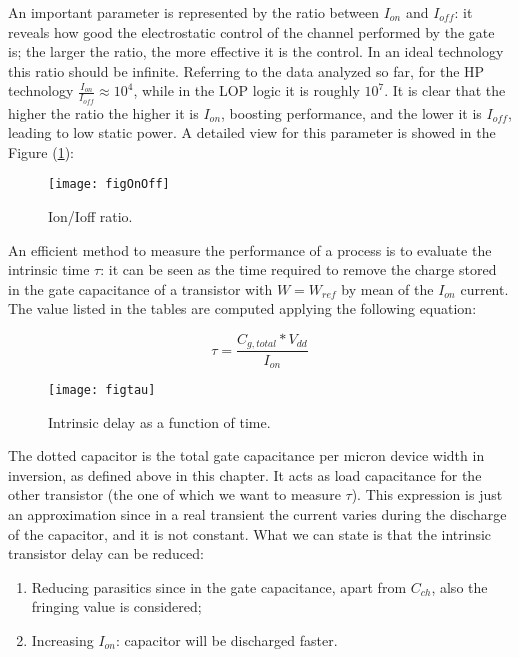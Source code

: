 \documentclass[a4paper, 12pt, twoside, openright]{report}
\begin{document}
An important parameter is represented by the ratio between $I_{on}$ and $I_{off}$: it reveals how good the electrostatic control of the channel performed by the gate is; the larger the ratio, the more effective it is the control. In an ideal technology this ratio should be infinite. Referring to the data analyzed so far, for the HP technology $\frac{I_{on}}{I_{off}} \approx 10^4$, while in the LOP logic it is roughly $10^7$. It is clear that the higher the ratio the higher it is $I_{on}$, boosting performance, and the lower it is $I_{off}$, leading to low static power. A detailed view for this parameter is showed in the Figure (\ref{OnOff}):

	\begin{figure}[!h]
	\centering
	\texttt{[image: figOnOff]}
	\caption{Ion/Ioff ratio.}
	\label{OnOff}
	\end{figure}

An efficient method to measure the performance of a process is to evaluate the intrinsic time $\tau$: it can be seen as the time required to remove the charge stored in the gate capacitance of a transistor with $W=W_{ref}$ by mean of the $I_{on}$ current.
The value listed in the tables are computed applying the following equation:

\begin{equation}
\tau = \frac{C_{g,total}*V_{dd}}{I_{on}}
\label{}
\end{equation}

	\begin{figure}[h]
	\centering
	\texttt{[image: figtau]}
	\caption{Intrinsic delay as a function of time.}
	\label{tau}
	\end{figure}

The dotted capacitor is the total gate capacitance per micron device width in inversion, as defined above in this chapter. It acts as load capacitance for the other transistor (the one of which we want to measure $\tau$). This expression is just an approximation since in a real transient the current varies during the discharge of the capacitor, and it is not constant. What we can state is that the intrinsic transistor delay can be reduced:

	\begin{enumerate}
		\item Reducing parasitics since in the gate capacitance, apart from $C_{ch}$, also the fringing value is considered;
		\item Increasing $I_{on}$: capacitor will be discharged faster.
	\end{enumerate}
\end{document}
